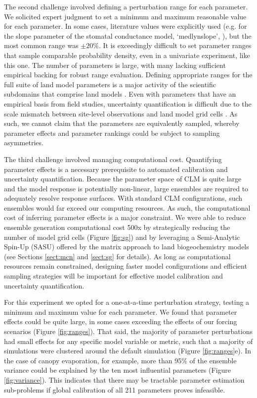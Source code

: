 \documentclass[draft]{agujournal2019}
\begin{document}
The second challenge involved defining a perturbation range for each parameter. We solicited expert judgment to set a minimum and maximum reasonable value for each parameter. In some cases, literature values were explicitly used (e.g. for the slope parameter of the stomatal conductance model, `medlynslope', ), but the most common range was $\pm20\%$. It is exceedingly difficult to set parameter ranges that sample comparable probability density, even in a univariate experiment, like this one. The number of parameters is large, with many lacking sufficient empirical backing for robust range evaluation. Defining appropriate ranges for the full suite of land model parameters is a major activity of the scientific subdomains that comprise land models \cite{kattge2020}. Even with parameters that have an empirical basis from field studies, uncertainty quantification is difficult due to the scale mismatch between site-level observations and land model grid cells \cite{liu2021}. As such, we cannot claim that the parameters are equivalently sampled, whereby parameter effects and parameter rankings could be subject to sampling asymmetries.

The third challenge involved managing computational cost. Quantifying parameter effects is a necessary prerequisite to automated calibration and uncertainty quantification. Because the parameter space of CLM is quite large and the model response is potentially non-linear, large ensembles are required to adequately resolve response surfaces. With standard CLM configurations, such ensembles would far exceed our computing resources. As such, the computational cost of inferring parameter effects is a major constraint. We were able to reduce ensemble generation computational cost 500x by strategically reducing the number of model grid cells (Figure \ref{fig:sg}) and by leveraging a Semi-Analytic Spin-Up (SASU) offered by the matrix approach to land biogeochemistry models \cite{lu2020,luo2022,liao2023} (see Sections \ref{sect:mcn} and \ref{sect:sg} for details). As long as computational resources remain constrained, designing faster model configurations and efficient sampling strategies will be important for effective model calibration and uncertainty quantification. 

For this experiment we opted for a one-at-a-time perturbation strategy, testing a minimum and maximum value for each parameter. We found that parameter effects could be quite large, in some cases exceeding the effects of our forcing scenarios (Figure \ref{fig:ranges}). That said, the majority of parameter perturbations had small effects for any specific model variable or metric, such that a majority of simulations were clustered around the default simulation (Figure \ref{fig:ranges}e). In the case of canopy evaporation, for example, more than 95\% of the ensemble variance could be explained by the ten most influential parameters (Figure \ref{fig:variance}). This indicates that there may be tractable parameter estimation sub-problems if global calibration of all 211 parameters proves infeasible. 
\end{document}
